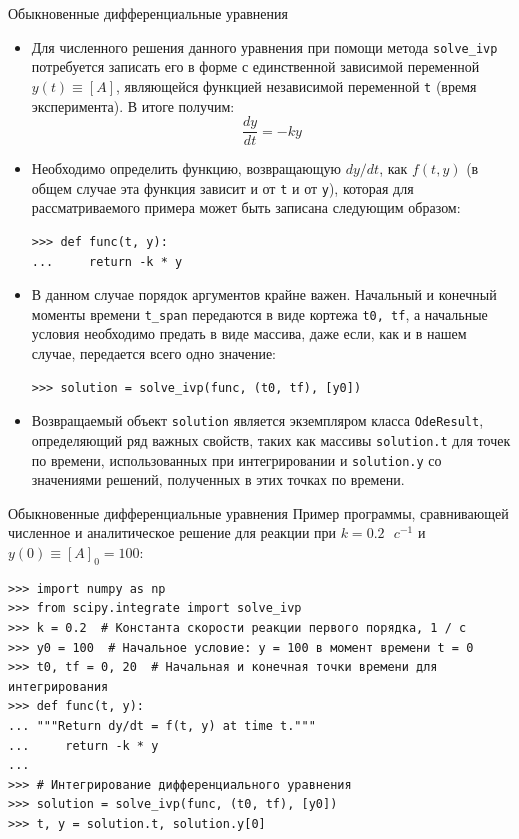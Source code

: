 \documentclass[aspectratio=169, mathserif]{beamer}	%
\begin{document}
\begin{frame}[fragile, label=c]{Обыкновенные дифференциальные уравнения}
\scriptsize
\begin{itemize}
	\item Для численного решения данного уравнения при помощи метода \texttt{solve\_ivp} потребуется записать его в форме с единственной зависимой переменной $y(t) \equiv \left[A\right]$, являющейся функцией независимой переменной \texttt{t} (время эксперимента). В итоге получим:
\vfill
$$
	\dfrac{dy}{dt} = -ky
$$
\vfill
	\item Необходимо определить функцию, возвращающую $dy/dt$, как $f(t, y)$ (в общем случае эта функция зависит и от \texttt{t} и от \texttt{y}), которая для рассматриваемого примера может быть записана следующим образом:
\vfill
\begin{verbatim}
>>> def func(t, y):
...     return -k * y
\end{verbatim}
\vfill
	\item 	В данном случае порядок аргументов крайне важен. Начальный и конечный моменты времени \texttt{t\_span} передаются в виде кортежа \texttt{t0, tf}, а начальные условия необходимо предать в виде массива, даже если, как и в нашем случае, передается всего одно значение:
\vfill
\begin{verbatim}
>>> solution = solve_ivp(func, (t0, tf), [y0])
\end{verbatim}
\vfill
	\item Возвращаемый объект \texttt{solution} является экземпляром класса \texttt{OdeResult}, определяющий ряд важных свойств, таких как массивы \texttt{solution.t} для точек по времени, использованных при интегрировании и \texttt{solution.y} со значениями решений, полученных в этих точках по времени.
\end{itemize}
\vfill
\end{frame}

\begin{frame}[fragile, label=c]{Обыкновенные дифференциальные уравнения}
\scriptsize
Пример программы, сравнивающей численное и аналитическое решение для реакции при $k = 0.2 \text{ } c^{-1}$ и $y(0) \equiv \left[A\right]_0 = 100$:
\vfill
\begin{verbatim}
>>> import numpy as np
>>> from scipy.integrate import solve_ivp
>>> k = 0.2  # Константа скорости реакции первого порядка, 1 / с
>>> y0 = 100  # Начальное условие: y = 100 в момент времени t = 0
>>> t0, tf = 0, 20  # Начальная и конечная точки времени для интегрирования
>>> def func(t, y):
... """Return dy/dt = f(t, y) at time t."""
...     return -k * y
...
>>> # Интегрирование дифференциального уравнения
>>> solution = solve_ivp(func, (t0, tf), [y0])
>>> t, y = solution.t, solution.y[0]
\end{verbatim}
\vfill
\end{frame}
\end{document}
